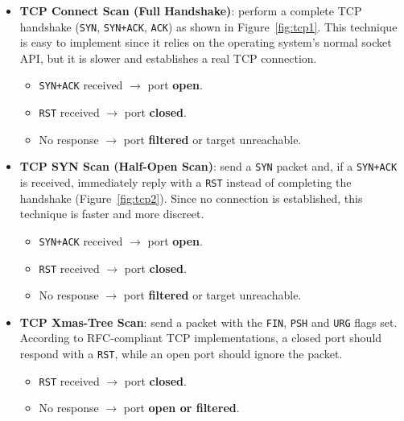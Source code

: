 \begin{itemize}
    \item \textbf{TCP Connect Scan (Full Handshake)}: perform a complete TCP handshake (\texttt{SYN}, \texttt{SYN+ACK}, \texttt{ACK}) as shown in Figure~\ref{fig:tcp1}. This technique is easy to implement since it relies on the operating system's normal socket API, but it is slower and establishes a real TCP connection.
    
    \begin{itemize}
        \item \texttt{SYN+ACK} received $\rightarrow$ port \textbf{open}.
        \item \texttt{RST} received $\rightarrow$ port \textbf{closed}.
        \item No response $\rightarrow$ port \textbf{filtered} or target unreachable.
    \end{itemize}

    \item \textbf{TCP SYN Scan (Half-Open Scan)}: send a \texttt{SYN} packet and, if a \texttt{SYN+ACK} is received, immediately reply with a \texttt{RST} instead of completing the handshake (Figure~\ref{fig:tcp2}). Since no connection is established, this technique is faster and more discreet.
    
    \begin{itemize}
        \item \texttt{SYN+ACK} received $\rightarrow$ port \textbf{open}.
        \item \texttt{RST} received $\rightarrow$ port \textbf{closed}.
        \item No response $\rightarrow$ port \textbf{filtered} or target unreachable.
    \end{itemize}

    \item \textbf{TCP Xmas-Tree Scan}: send a packet with the \texttt{FIN}, \texttt{PSH} and \texttt{URG} flags set. According to RFC-compliant TCP implementations, a closed port should respond with a \texttt{RST}, while an open port should ignore the packet.
    
    \begin{itemize}
        \item \texttt{RST} received $\rightarrow$ port \textbf{closed}.
        \item No response $\rightarrow$ port \textbf{open or filtered}.
    \end{itemize}
\end{itemize}


